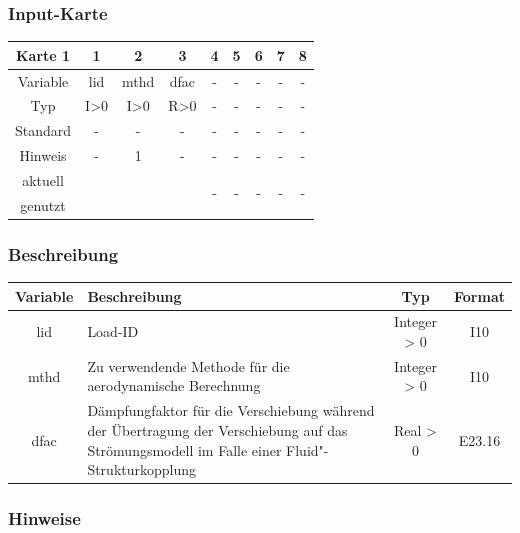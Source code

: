 \documentclass[11pt,titlepage,listof=totoc,bibliography=totoc,twoside]{scrreprt}
\begin{document}
{{\subsubsection{Input-Karte}

\begin{table}[htbp]
\centering
\begin{tabularx}{\textwidth}{cCCCCCCCC}
\toprule
Karte 1         & 1     & 2          & 3     & 4  & 5  & 6  & 7  & 8  \\
\midrule
Variable        & lid   & mthd       & dfac  & -  & -  & -  & -  & -  \\
Typ             & I>0   & I>0        & R>0   & -  & -  & -  & -  & -  \\
Standard        & -     & -          & -     & -  & -  & -  & -  & -  \\
Hinweis         & -     & 1          & -     & -  & -  & -  & -  & -  \\
aktuell         &  &  &  &   &   &   &   &   \\
genutzt \\
\bottomrule
\end{tabularx}
\end{table}

\subsubsection{Beschreibung}

\begin{tabularx}{\textwidth}{cXcc}
\toprule
Variable  & Beschreibung  & Typ          & Format  \\
\midrule
lid       & Load-ID       & Integer > 0  & I10     \\
mthd      & Zu verwendende Methode für die aerodynamische Berechnung & Integer > 0 & I10  \\
dfac      & Dämpfungfaktor für die Verschiebung während der Übertragung der Verschiebung auf das Strömungsmodell im Falle einer Fluid"-Strukturkopplung & Real > 0 & E23.16  \\
\bottomrule
\end{tabularx}

\subsubsection{Hinweise}

}}
\end{document}
